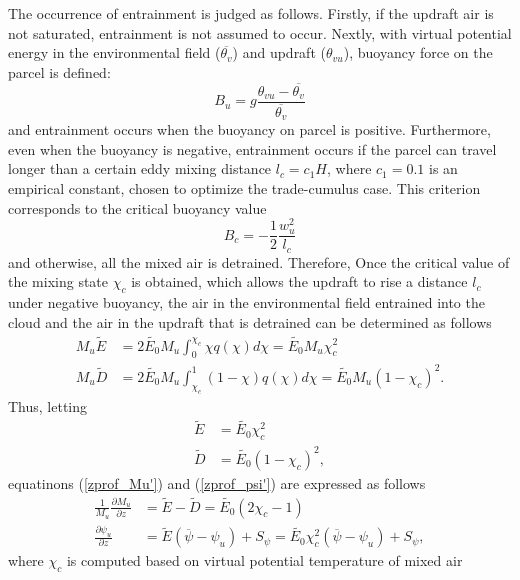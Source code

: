 The occurrence of entrainment is judged as follows. Firstly, if the updraft air is not saturated, entrainment is not assumed to occur.
Nextly, with virtual potential energy in the environmental field ($\overline{\theta_v}$) and updraft ($\theta_{vu}$), buoyancy force on the parcel is defined:
\begin{equation}\label{buoy_u}
    B_u = g\frac{\theta_{vu} - \overline{\theta_{v}}}{ \overline{\theta_v}}
\end{equation}
and entrainment occurs when the buoyancy on parcel is positive.
Furthermore, even when the buoyancy is negative, entrainment occurs if the parcel can travel longer than a certain eddy mixing distance $l_c=c_1 H$, where $c_1=0.1$ is an empirical constant, 
chosen to optimize the trade-cumulus case. This criterion corresponds to the critical buoyancy value
\begin{equation}\label{buoy_c}
    B_c = -\frac{1}{2}\frac{w_u^2}{l_c}    
\end{equation}
and otherwise, all the mixed air is detrained.
Therefore, Once the critical value of the mixing state $\chi_c$ is obtained, which allows the updraft to rise a distance $l_c$ under negative buoyancy, 
the air in the environmental field entrained into the cloud and the air in the updraft that is detrained can be determined as follows
\begin{align}
    M_u\tilde{E}&=2\tilde{E_0} M_u\int_0^{\chi_c}\chi q(\chi) d\chi = \tilde{E_0} M_u \chi_c^2 \label{flux_entre}\\
    M_u\tilde{D}&=2\tilde{E_0} M_u\int_{\chi_c}^{1}(1-\chi) q(\chi) d\chi = \tilde{E_0} M_u (1-\chi_c)^2. \label{flux_detre}
\end{align}
Thus, letting
\begin{align}
    \tilde{E}&=\tilde{E_0}\chi_c^2 \label{Etilde}\\
    \tilde{D}&=\tilde{E_0}(1-\chi_c)^2, \label{Dtilde}
\end{align}
equatinons (\ref{zprof_Mu'}) and (\ref{zprof_psi'}) are expressed as follows
\begin{align}
    \frac{1}{M_u}\frac{\partial M_u}{\partial z} &= \tilde{E} - \tilde{D} = \tilde{E_0}(2\chi_c - 1) \label{zprof_Mu_param}\\
    \frac{\partial \psi_u}{\partial z} &= \tilde{E} (\overline{\psi}-\psi_u) + S_{\psi} = \tilde{E_0}\chi_c^2(\overline{\psi}-\psi_u) + S_{\psi}, \label{zprof_psi_param}
\end{align}
where $\chi_c$ is computed based on virtual potential temperature of mixed air
